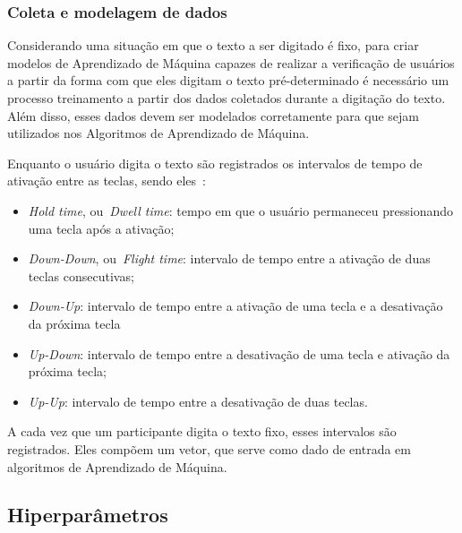 \subsubsection{Coleta e modelagem de dados}\label{subsubsec:coleta_e_modelagem}

Considerando uma situação em que o texto a ser digitado é fixo, para criar modelos de Aprendizado de Máquina capazes de realizar a verificação de usuários a partir da forma com que eles digitam o texto pré-determinado é necessário um processo treinamento a partir dos dados coletados durante a digitação do texto. Além disso, esses dados devem ser modelados corretamente para que sejam utilizados nos Algoritmos de Aprendizado de Máquina.

Enquanto o usuário digita o texto são registrados os intervalos de tempo de ativação entre as teclas, sendo eles~\cite{Dias2023keyrecs}:

\begin{itemize}
    \item{\textit{Hold time}, ou~\textit{Dwell time}}: tempo em que o usuário permaneceu pressionando uma tecla após a ativação;
    \item{\textit{Down-Down}, ou~\textit{Flight time}}: intervalo de tempo entre a ativação de duas teclas consecutivas;
    \item{\textit{Down-Up}}: intervalo de tempo entre a ativação de uma tecla e a desativação da próxima tecla
    \item{\textit{Up-Down}}: intervalo de tempo entre a desativação de uma tecla e ativação da próxima tecla;
    \item{\textit{Up-Up}}: intervalo de tempo entre a desativação de duas teclas.
\end{itemize}

A cada vez que um participante digita o texto fixo, esses intervalos são registrados. Eles compõem um vetor, que serve como dado de entrada em algoritmos de Aprendizado de Máquina. 


\subsection{Hiperparâmetros}\label{subsec:ajuste_de_hiperparametros}

